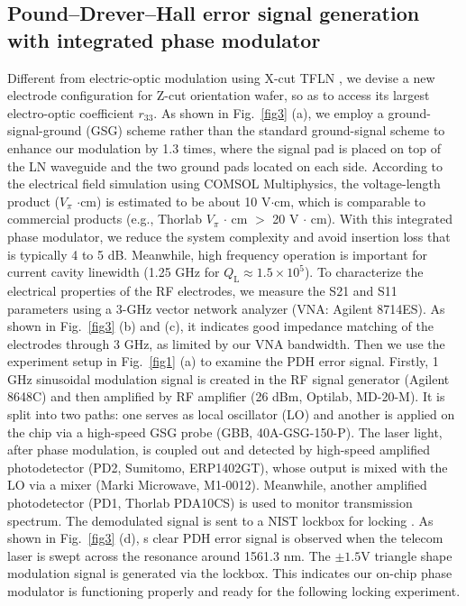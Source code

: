\documentclass{WileyMSP-template}
\begin{document}
\subsection{Pound–Drever–Hall error signal generation with integrated phase modulator}
\label{PDH}
Different from electric-optic modulation using X-cut TFLN \cite{jin2019high}, we devise a new electrode configuration for Z-cut orientation wafer, so as to access its largest electro-optic coefficient $r_{33}$. As shown in Fig.~\ref{fig3} (a), we employ a ground-signal-ground (GSG) scheme rather than the standard ground-signal scheme to enhance our modulation by 1.3 times, where the signal pad is placed on top of the LN waveguide and the two ground pads located on each side. According to the electrical field simulation using COMSOL Multiphysics, the voltage-length product ($V_{\pi}$ $\cdot$cm) is estimated to be about 10 V$\cdot$cm, which is comparable to commercial products (e.g., Thorlab $V_{\pi}$ $\cdot$ cm $>$ 20 V $\cdot$ cm). With this integrated phase modulator, we reduce the system complexity and avoid insertion loss that is typically 4 to 5 dB. Meanwhile, high frequency operation is important for current cavity linewidth (1.25 GHz for $Q_\mathrm{L} \approx 1.5 \times 10^5$). To characterize the electrical properties of the RF electrodes, we measure the S21 and S11 parameters using a 3-GHz vector network analyzer (VNA: Agilent 8714ES). As shown in Fig.~\ref{fig3} (b) and (c), it indicates good impedance matching of the electrodes through 3 GHz, as limited by our VNA bandwidth. Then we use the experiment setup in Fig.~\ref{fig1} (a) to examine the PDH error signal. Firstly, 1 GHz sinusoidal modulation signal is created in the RF signal generator (Agilent 8648C) and then amplified by RF amplifier (26 dBm, Optilab, MD-20-M). It is split into two paths: one serves as local oscillator (LO) and another is applied on the chip via a high-speed GSG probe (GBB, 40A-GSG-150-P). The laser light, after phase modulation, is coupled out and detected by high-speed amplified photodetector (PD2, Sumitomo, ERP1402GT), whose output is mixed with the LO via a mixer (Marki Microwave, M1-0012). Meanwhile, another amplified photodetector (PD1, Thorlab PDA10CS) is used to monitor transmission spectrum. The demodulated signal is sent to a NIST lockbox for locking \cite{leibrandt2015open}. As shown in Fig.~\ref{fig3} (d), s clear PDH error signal is observed when the telecom laser is swept across the resonance around 1561.3 nm. The $\pm1.5$V triangle shape modulation signal is generated via the lockbox. This indicates our on-chip phase modulator is functioning properly and ready for the following locking experiment. 
\end{document}

